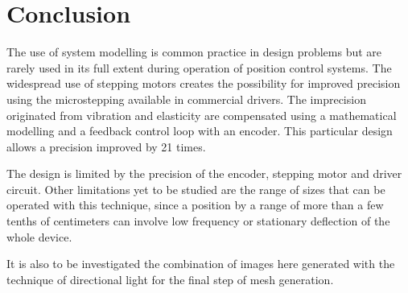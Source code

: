\documentclass[journal]{IEEEtran}
\begin{document}
\section{Conclusion}

The use of system modelling is common practice in design problems but are rarely used in its full extent during operation of position control systems. The widespread use of stepping motors creates the possibility for improved precision using the microstepping available in commercial drivers. The imprecision originated from vibration and elasticity are compensated using a mathematical modelling and a feedback control loop with an encoder. This particular design allows a precision improved by 21 times.

The design is limited by the precision of the encoder, stepping motor and driver circuit. Other limitations yet to be studied are the range of sizes that can be operated with this technique, since a position by a range of more than a few tenths of centimeters can involve low frequency or stationary deflection of the whole device.

It is also to be investigated the combination of images here generated with the technique of directional light for the final step of mesh generation.



%
\end{document}
